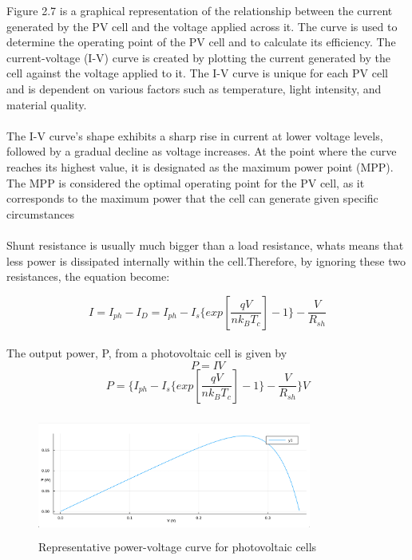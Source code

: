 \documentclass{report}
\begin{document}
\hfill \break
Figure 2.7 is a graphical representation of the relationship between the current generated by the PV cell and the voltage applied across it. The curve is used to determine the operating point of the PV cell and to calculate its efficiency. The current-voltage (I-V) curve is created by plotting the current generated by the cell against the voltage applied to it. The I-V curve is unique for each PV cell and is dependent on various factors such as temperature, light intensity, and material quality.\\
\\
The I-V curve's shape exhibits a sharp rise in current at lower voltage levels, followed by a gradual decline as voltage increases. At the point where the curve reaches its highest value, it is designated as the maximum power point (MPP). The MPP is considered the optimal operating point for the PV cell, as it corresponds to the maximum power that the cell can generate given specific circumstances\\
\\
Shunt resistance is usually much bigger than a load resistance, whats means that less power is dissipated internally within the cell.Therefore, by ignoring these two resistances, the equation become:

\begin{equation}
I = I_{ph} - I_{D} = I_{ph} - I_{s} \{ exp
 \left[  \frac{qV}{nk_{B}T_{c}} \right] - 1 \}  - \frac{V}{R_{sh}}
\end{equation}
\\
The output power, P, from a photovoltaic cell is given by
\begin{equation}
P = IV
\end{equation}
\begin{equation}
P =  \{I_{ph} - I_{s} \{ exp
 \left[  \frac{qV}{nk_{B}T_{c}} \right] - 1 \} - \frac{V}{R_{sh}} \} V
\end{equation}
\begin{figure}[h!]
    \centering
    \includegraphics[width=9cm, height=4cm] {PV.png}
    \caption{Representative power-voltage curve for photovoltaic cells}
    \label{fig:my_label}
\end{figure}
\end{document}
